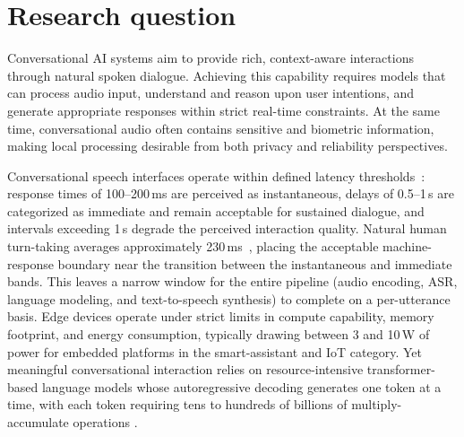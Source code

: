 \documentclass[manuscript,]{acmart} %
\begin{document}
\section{Research question} \label{sec:research_question}
Conversational AI systems aim to provide rich, context-aware interactions through natural spoken dialogue. Achieving this capability requires models that can process audio input, understand and reason upon user intentions, and generate appropriate responses within strict real-time constraints. At the same time, conversational audio often contains sensitive and biometric information, making local processing desirable from both privacy and reliability perspectives.

Conversational speech interfaces operate within defined latency
thresholds~\cite{doherty2015flow,defossez2025moshi}: response times of
100--200\,ms are perceived as instantaneous, delays of 0.5--1\,s are
categorized as immediate and remain acceptable for sustained dialogue,
and intervals exceeding 1\,s degrade the perceived interaction quality.
Natural human turn-taking averages approximately 230\,ms~\cite{defossez2025moshi},
placing the acceptable machine-response boundary near the transition
between the instantaneous and immediate bands.
This leaves a narrow window for the entire pipeline (audio encoding,
ASR, language modeling, and text-to-speech synthesis) to complete on a per-utterance basis.
Edge devices operate under strict limits in compute capability, memory footprint,
and energy consumption, typically drawing between 3 and 10\,W of power for embedded platforms in the smart-assistant and IoT category. Yet meaningful
conversational interaction relies on resource-intensive transformer-based language
models whose autoregressive decoding generates one token at a time, with each
token requiring tens to hundreds of billions of multiply-accumulate operations \cite{pope2022efficiently}.
\end{document}
